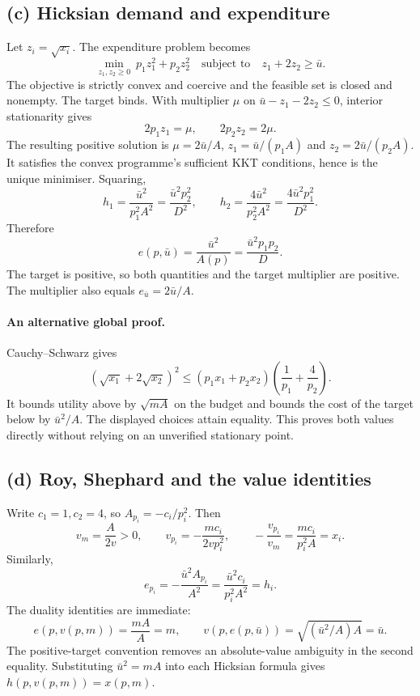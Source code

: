 \documentclass[11pt,a4paper]{article}
\begin{document}
\subsection*{(c) Hicksian demand and expenditure}
Let $z_i=\sqrt{x_i}$. The expenditure problem becomes
\[
 \min_{z_1,z_2\ge0}\ p_1z_1^2+p_2z_2^2
 \quad\text{subject to}\quad z_1+2z_2\ge\bar u.
\]
The objective is strictly convex and coercive and the feasible set is closed
and nonempty. The target binds. With multiplier $\mu$ on
$\bar u-z_1-2z_2\le0$, interior stationarity gives
\[
 2p_1z_1=\mu,\qquad 2p_2z_2=2\mu.
\]
The resulting positive solution is
$\mu=2\bar u/A$, $z_1=\bar u/(p_1A)$ and $z_2=2\bar u/(p_2A)$.
It satisfies the convex programme's sufficient KKT conditions, hence is the
unique minimiser. Squaring,
\[
 \boxed{h_1=\frac{\bar u^2}{p_1^2A^2}
 =\frac{\bar u^2p_2^2}{D^2}},\qquad
 \boxed{h_2=\frac{4\bar u^2}{p_2^2A^2}
 =\frac{4\bar u^2p_1^2}{D^2}}.
\]
Therefore
\[
 \boxed{e(p,\bar u)=\frac{\bar u^2}{A(p)}
 =\frac{\bar u^2p_1p_2}{D}}.
\]
The target is positive, so both quantities and the target multiplier are
positive. The multiplier also equals $e_{\bar u}=2\bar u/A$.

\paragraph{An alternative global proof.} Cauchy--Schwarz gives
\[
 (\sqrt{x_1}+2\sqrt{x_2})^2
 \le (p_1x_1+p_2x_2)\left(\frac1{p_1}+\frac4{p_2}\right).
\]
It bounds utility above by $\sqrt{mA}$ on the budget and bounds the cost of
the target below by $\bar u^2/A$. The displayed choices attain equality.
This proves both values directly without relying on an unverified stationary point.

\subsection*{(d) Roy, Shephard and the value identities}
Write $c_1=1,c_2=4$, so $A_{p_i}=-c_i/p_i^2$. Then
\[
 v_m=\frac{A}{2v}>0,\qquad
 v_{p_i}=-\frac{mc_i}{2vp_i^2},\qquad
 -\frac{v_{p_i}}{v_m}=\frac{mc_i}{p_i^2A}=x_i.
\]
Similarly,
\[
 e_{p_i}=-\frac{\bar u^2 A_{p_i}}{A^2}
 =\frac{\bar u^2c_i}{p_i^2A^2}=h_i.
\]
The duality identities are immediate:
\[
 e(p,v(p,m))=\frac{mA}{A}=m,\qquad
 v(p,e(p,\bar u))=\sqrt{(\bar u^2/A)A}=\bar u.
\]
The positive-target convention removes an absolute-value ambiguity in the
second equality. Substituting $\bar u^2=mA$ into each Hicksian formula gives
$h(p,v(p,m))=x(p,m)$.
\end{document}
